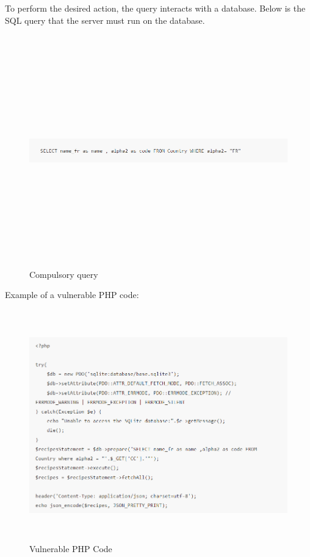 \begin{itemize}
\begin{itemize}
        \newpage
        To perform the desired action, the query interacts with a database. Below is the SQL query that the server must run on the database.
        \begin{figure}[!h]
         \centering
         \includegraphics[width=\linewidth, height=10cm,keepaspectratio]{figures/ex2.PNG}
         \caption{Compulsory query}
        \end{figure}
        \newpage
        Example of a vulnerable PHP code:
        \begin{figure}[!h]
         \centering
         \includegraphics[width=\linewidth, height=10cm,keepaspectratio]{figures/ex3.PNG}
         \caption{Vulnerable PHP Code}
        \end{figure}
        

\end{itemize}
\end{itemize}
